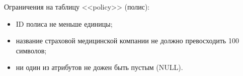 Ограничения на таблицу <<policy>> (полис):

\begin{itemize}
  \item ID полиса не меньше единицы;
  \item название страховой медицинской компании не должно превосходить 100 символов;
  \item ни один из атрибутов не дожен быть пустым (NULL).
\end{itemize}
